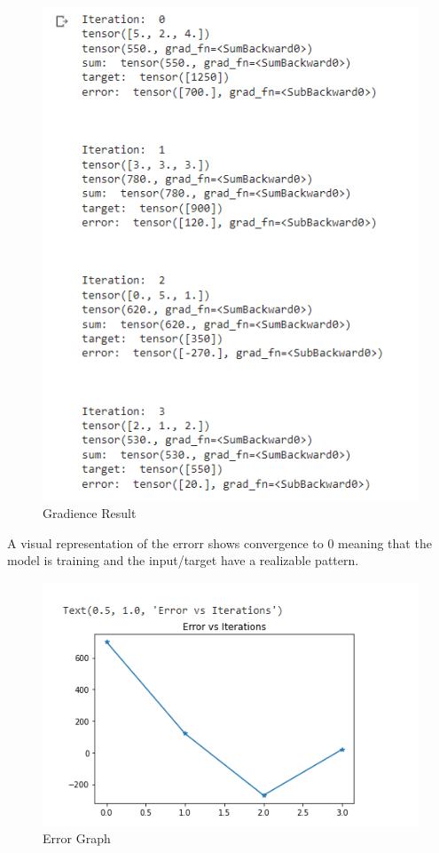 \documentclass[24pt, letterpaper]{article}
\begin{document}
		\begin{figure}[ht]
			\centering
			\includegraphics[width=0.7\linewidth]{Lab1Img/Linear_R1}
			\caption{Gradience Result}
			\label{fig:Linear Result}
		\end{figure}
		\FloatBarrier	
	A visual representation of the errorr shows convergence to 0 meaning that the model is training and the input/target have a realizable pattern.
		\begin{figure}[ht]
			\centering
			\includegraphics[width=0.7\linewidth]{Lab1Img/Linear_R2}
			\caption{Error Graph}
			\label{fig:Linear Result}
		\end{figure}
		\FloatBarrier	
	
	

\end{document}

